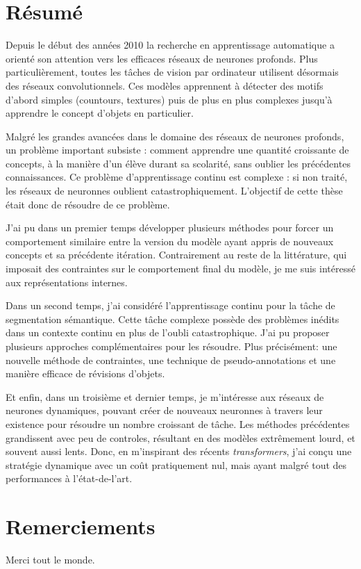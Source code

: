 \cleardoublepage


\chapter{R\'esum\'e}


Depuis le début des années 2010 la recherche en apprentissage automatique a orienté son attention
vers les efficaces réseaux de neurones profonds. Plus particulièrement, toutes les tâches de vision
par ordinateur utilisent désormais des réseaux convolutionnels. Ces modèles apprennent à détecter
des motifs d'abord simples (countours, textures) puis de plus en plus complexes jusqu'à apprendre
le concept d'objets en particulier.

Malgré les grandes avancées dans le domaine des réseaux de neurones profonds, un problème important
subsiste : comment apprendre une quantité croissante de concepts, à la manière d'un élève durant sa
scolarité, sans oublier les précédentes connaissances. Ce problème d'apprentissage continu est
complexe : si non traité, les réseaux de neuronnes oublient catastrophiquement. L'objectif de cette
thèse était donc de résoudre de ce problème.

J'ai pu dans un premier temps développer plusieurs méthodes pour forcer un comportement similaire
entre la version du modèle ayant appris de nouveaux concepts et sa précédente itération.
Contrairement au reste de la littérature, qui imposait des contraintes sur le comportement final du
modèle, je me suis intéressé aux représentations internes.

Dans un second temps, j'ai considéré l'apprentissage continu pour la tâche de segmentation
sémantique. Cette tâche complexe possède des problèmes inédits dans un contexte continu en plus de
l'oubli catastrophique. J'ai pu proposer plusieurs approches complémentaires pour les résoudre. Plus
précisément: une nouvelle méthode de contraintes, une technique de pseudo-annotations et une
manière efficace de révisions d'objets.

Et enfin, dans un troisième et dernier temps, je m'intéresse aux réseaux de neurones dynamiques,
pouvant créer de nouveaux neuronnes à travers leur existence pour résoudre un nombre croissant de
tâche. Les méthodes précédentes grandissent avec peu de controles, résultant en des modèles
extrêmement lourd, et souvent aussi lents. Donc, en m'inspirant des récents \textit{transformers},
j'ai conçu une stratégie dynamique avec un coût pratiquement nul, mais ayant malgré tout des
performances à l'état-de-l'art.


\cleardoublepage
\chapter{Remerciements}


Merci tout le monde.

